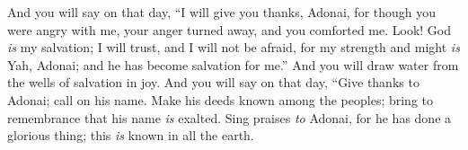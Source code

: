 \begin{biblechapter} %
 And you will say on that day, 
“I will give you thanks, Adonai, 
for though you were angry with me, 
your anger turned away, 
and you comforted me.
\verse Look! God \textit{is} my salvation; 
I will trust, and I will not be afraid, 
for my strength and might \textit{is} Yah, Adonai; 
and he has become salvation for me.”
\verse And you will draw water from the wells of salvation in joy.
\verse And you will say on that day,
\verse “Give thanks to Adonai; 
call on his name. 
Make his deeds known among the peoples; 
bring to remembrance that his name \textit{is} exalted.
\verse Sing praises \textit{to} Adonai, for he has done a glorious thing; 
this \textit{is} known in all the earth.
\end{biblechapter}

